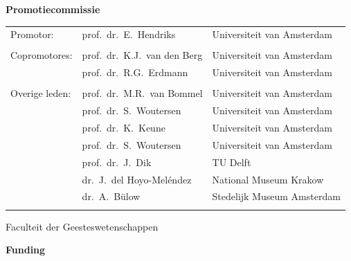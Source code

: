 








\afterpage{\blankpage}
\newpage
{\Large\textbf{Promotiecommissie}}

\vspace{1cm}


\medskip\noindent
\begin{tabular}{@{}lll@{}}
  Promotor: & prof.\ dr.\ E.\ Hendriks &  Universiteit van Amsterdam\\
  & & \\
  Copromotores: & prof.\ dr.\ K.J.\ van den Berg &  Universiteit van Amsterdam\\  
  & prof.\ dr.\ R.G.\ Erdmann &  Universiteit van Amsterdam\\
  & & \\
  Overige leden: & prof.\ dr.\ M.R.\ van Bommel & Universiteit van Amsterdam \\  
  & prof.\ dr.\ S.\ Woutersen & Universiteit van Amsterdam \\
  & prof.\ dr.\ K.\ Keune & Universiteit van Amsterdam  \\  
  & prof.\ dr.\ S.\ Woutersen & Universiteit van Amsterdam \\
  & prof.\ dr.\ J.\ Dik & TU Delft \\
  & dr.\ J.\ del Hoyo-Meléndez & National Museum Krakow \\
  & dr.\ A.\ Bülow & Stedelijk Museum Amsterdam\\
\\

\end{tabular}

\vspace{0.5cm}
Faculteit der Geesteswetenschappen



\newpage

{\Large\textbf{Funding}}\\

